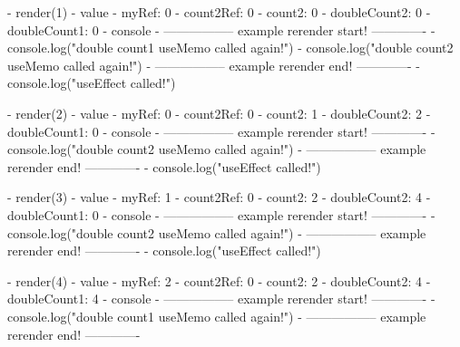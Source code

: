 - render(1)
  - value
    - myRef: 0
    - count2Ref: 0
    - count2: 0
    - doubleCount2: 0
    - doubleCount1: 0
  - console
    - ----------------- example rerender start! -------------
    - console.log("double count1 useMemo called again!")
    - console.log("double count2 useMemo called again!")
    - ----------------- example rerender end! -------------
    - console.log("useEffect called!")

- render(2)
  - value
    - myRef: 0
    - count2Ref: 0
    - count2: 1
    - doubleCount2: 2
    - doubleCount1: 0
  - console
    - ----------------- example rerender start! -------------
    - console.log("double count2 useMemo called again!")
    - ----------------- example rerender end! -------------  
    - console.log("useEffect called!")
    
    
- render(3)
  - value
    - myRef: 1
    - count2Ref: 0
    - count2: 2
    - doubleCount2: 4
    - doubleCount1: 0
  - console
    - ----------------- example rerender start! -------------
    - console.log("double count2 useMemo called again!")
    - ----------------- example rerender end! -------------   
    - console.log("useEffect called!")
    

- render(4)
  - value
    - myRef:  2
    - count2Ref: 0
    - count2: 2
    - doubleCount2: 4
    - doubleCount1: 4
  - console
    - ----------------- example rerender start! -------------
    - console.log("double count1 useMemo called again!")
    - ----------------- example rerender end! -------------   